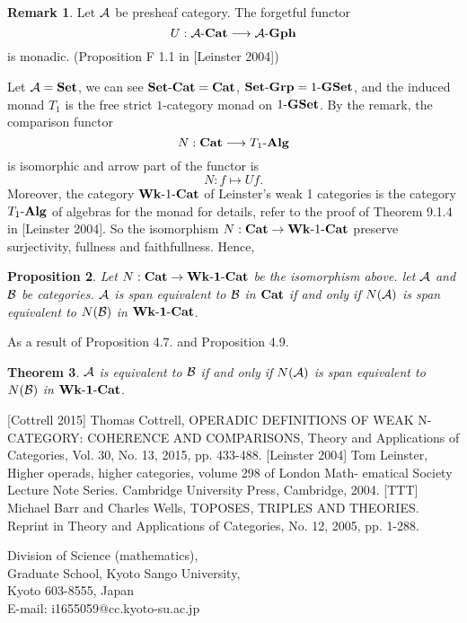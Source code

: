 \documentclass[12pt]{article}
\theoremstyle{plain}
\newtheorem{theorem}{Theorem}[section]
\newtheorem{proposition}[theorem]{Proposition}
\theoremstyle{definition}
\newtheorem{remark}[theorem]{Remark}
\begin{document}
\begin{remark}
Let ${\cal A}$ be presheaf category. The forgetful functor
\[
U: {\cal A} \mathchar`- {\bf Cat} \longrightarrow {\cal A} \mathchar`- {\bf Gph}
\]
is monadic. (Proposition F 1.1 in [Leinster 2004])
\end{remark}
\noindent
Let ${\cal A} = {\bf Set}$, we can see ${\bf Set} \mathchar`- {\bf Cat} = {\bf Cat}$, ${\bf Set} \mathchar`- {\bf Grp} = 1 \mathchar`- {\bf GSet}$, and the induced monad $T_1$ is the free strict $1$-category monad on $1 \mathchar`- {\bf GSet}$. By the remark, the comparison functor 
\[
N: {\bf Cat} \longrightarrow T_1 \mathchar`- {\bf Alg}
\]
is isomorphic and arrow part of the functor is
\[
N: f \longmapsto Uf .
\]
Moreover, the category ${\bf Wk} \mathchar`- 1 \mathchar`- {\bf Cat}$ of Leinster's weak 1 categories is the category $T_1 \mathchar`- {\bf Alg}$ of algebras for the monad for details,  refer to the proof of Theorem 9.1.4 in [Leinster 2004].
So the isomorphism $N: {\bf Cat} \rightarrow {\bf Wk} \mathchar`- 1 \mathchar`- {\bf Cat}$ preserve surjectivity, fullness and faithfullness. Hence,

\begin{proposition}
Let $N: {\bf Cat} \rightarrow {\bf Wk \mathchar`- 1 \mathchar`- Cat}$ be the isomorphism above. let ${\cal A}$ and ${\cal B}$ be categories. ${\cal A}$ is span equivalent to ${\cal B}$ in ${\bf Cat}$ if and only if $N({\cal A})$ is span equivalent to $N({\cal B})$ in ${\bf Wk \mathchar`- 1 \mathchar`- Cat}$.
\end{proposition}

\noindent
As a result of Proposition 4.7. and Proposition 4.9.

\begin{theorem}
${\cal A}$ is equivalent to ${\cal B}$ if and only if $N({\cal A})$ is span equivalent to $N({\cal B})$ in ${\bf Wk \mathchar`- 1 \mathchar`- Cat}$.
\end{theorem}



\begin{thebibliography}{99}
 [Cottrell 2015] Thomas Cottrell, OPERADIC DEFINITIONS OF WEAK N-CATEGORY: COHERENCE AND COMPARISONS, Theory and Applications of Categories, Vol. 30, No. 13, 2015, pp. 433-488.
 [Leinster 2004] Tom Leinster, Higher operads, higher categories, volume 298 of London Math-
ematical Society Lecture Note Series. Cambridge University Press, Cambridge, 2004.
 [TTT] Michael Barr and Charles Wells, TOPOSES, TRIPLES AND THEORIES. Reprint in Theory and Applications of Categories, No. 12, 2005, pp. 1-288.
\end{thebibliography}


\vspace{5mm}
\noindent
Division of Science (mathematics), \\
Graduate School, Kyoto Sango University, \\
Kyoto 603-8555, Japan \\
E-mail: i1655059@cc.kyoto-su.ac.jp


\end{document}
